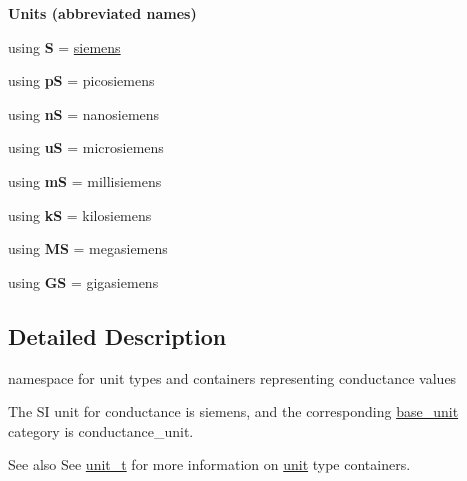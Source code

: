 \begin{Indent}{\bf Units (abbreviated names)}\par
\begin{DoxyCompactItemize}
\item 
\hypertarget{namespaceunits_1_1conductance_a66a9da13b83c2d228884cf697ea3026f}{}using {\bfseries S} = \hyperlink{structunits_1_1unit}{siemens}\label{namespaceunits_1_1conductance_a66a9da13b83c2d228884cf697ea3026f}

\item 
\hypertarget{namespaceunits_1_1conductance_a3d37fb554dcb71011c5b888031207c3c}{}using {\bfseries p\+S} = picosiemens\label{namespaceunits_1_1conductance_a3d37fb554dcb71011c5b888031207c3c}

\item 
\hypertarget{namespaceunits_1_1conductance_a817e899bc9fe1acd1af0a9680d80d3d7}{}using {\bfseries n\+S} = nanosiemens\label{namespaceunits_1_1conductance_a817e899bc9fe1acd1af0a9680d80d3d7}

\item 
\hypertarget{namespaceunits_1_1conductance_a0ce3d5c4e26a66c522b0a89d1248fc18}{}using {\bfseries u\+S} = microsiemens\label{namespaceunits_1_1conductance_a0ce3d5c4e26a66c522b0a89d1248fc18}

\item 
\hypertarget{namespaceunits_1_1conductance_ae0aa46f359f8b1a577a2232ed7b3dff6}{}using {\bfseries m\+S} = millisiemens\label{namespaceunits_1_1conductance_ae0aa46f359f8b1a577a2232ed7b3dff6}

\item 
\hypertarget{namespaceunits_1_1conductance_aa93f26be1268a4a4c228244faefad5cc}{}using {\bfseries k\+S} = kilosiemens\label{namespaceunits_1_1conductance_aa93f26be1268a4a4c228244faefad5cc}

\item 
\hypertarget{namespaceunits_1_1conductance_a3efef55bfe25e50048c58339b9091af9}{}using {\bfseries M\+S} = megasiemens\label{namespaceunits_1_1conductance_a3efef55bfe25e50048c58339b9091af9}

\item 
\hypertarget{namespaceunits_1_1conductance_ad3a6f4b0aaf6ceeb771f2fdb0b399f5c}{}using {\bfseries G\+S} = gigasiemens\label{namespaceunits_1_1conductance_ad3a6f4b0aaf6ceeb771f2fdb0b399f5c}

\end{DoxyCompactItemize}
\end{Indent}


\subsection{Detailed Description}
namespace for unit types and containers representing conductance values 

The S\+I unit for conductance is {\ttfamily siemens}, and the corresponding {\ttfamily \hyperlink{structunits_1_1base__unit}{base\+\_\+unit}} category is {\ttfamily conductance\+\_\+unit}. \begin{DoxySeeAlso}{See also}
See \hyperlink{classunits_1_1unit__t}{unit\+\_\+t} for more information on \hyperlink{structunits_1_1unit}{unit} type containers. 
\end{DoxySeeAlso}
